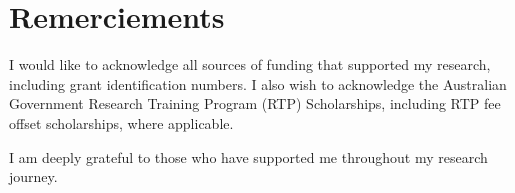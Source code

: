 \chapter*{Remerciements}

I would like to acknowledge all sources of funding that supported my research, including grant identification numbers. I also wish to acknowledge the Australian Government Research Training Program (RTP) Scholarships, including RTP fee offset scholarships, where applicable.

I am deeply grateful to those who have supported me throughout my research journey.